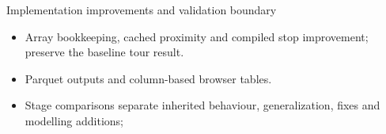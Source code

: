 \documentclass[aspectratio=169]{beamer}
\begin{document}
\begin{frame}{Implementation improvements and validation boundary}
\small
\begin{itemize}
\item Array bookkeeping, cached proximity and compiled stop improvement; preserve the baseline tour result.
\item Parquet outputs and column-based browser tables.\BrowserText
\item Stage comparisons separate inherited behaviour, generalization, fixes and modelling additions; \ValidationSummary
\end{itemize}
\vfill\scriptsize\BoundaryNote
\end{frame}
\end{document}
